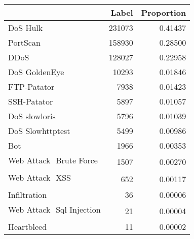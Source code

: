 \begin{tabular}{lrr}
\toprule
{} &   Label &  Proportion \\
\midrule
DoS Hulk                   &  231073 &     0.41437 \\
PortScan                   &  158930 &     0.28500 \\
DDoS                       &  128027 &     0.22958 \\
DoS GoldenEye              &   10293 &     0.01846 \\
FTP-Patator                &    7938 &     0.01423 \\
SSH-Patator                &    5897 &     0.01057 \\
DoS slowloris              &    5796 &     0.01039 \\
DoS Slowhttptest           &    5499 &     0.00986 \\
Bot                        &    1966 &     0.00353 \\
Web Attack  Brute Force   &    1507 &     0.00270 \\
Web Attack  XSS           &     652 &     0.00117 \\
Infiltration               &      36 &     0.00006 \\
Web Attack  Sql Injection &      21 &     0.00004 \\
Heartbleed                 &      11 &     0.00002 \\
\bottomrule
\end{tabular}
